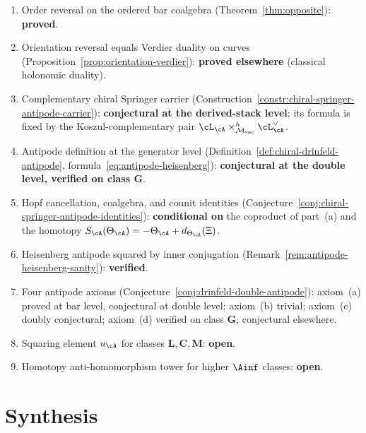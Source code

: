 \begin{remark}
\label{rem:antipode-status}
\begin{enumerate}[label=(\roman*)]
\item Order reversal on the ordered bar coalgebra
(Theorem~\ref{thm:opposite}): \textbf{proved}.
\item Orientation reversal equals Verdier duality on curves
(Proposition~\ref{prop:orientation-verdier}): \textbf{proved
elsewhere} (classical holonomic duality).
\item Complementary chiral Springer carrier
(Construction~\ref{constr:chiral-springer-antipode-carrier}):
\textbf{conjectural at the derived-stack level}; its formula is fixed
by the Koszul-complementary pair
\(\cL_{\cA}\times^h_{\Mvac}\cL_{\cA}^{\vee}\).
\item Antipode definition at the generator level
(Definition~\ref{def:chiral-drinfeld-antipode},
formula~\eqref{eq:antipode-heisenberg}): \textbf{conjectural at
the double level, verified on class $\mathbf{G}$}.
\item Hopf cancellation, coalgebra, and counit identities
(Conjecture~\ref{conj:chiral-springer-antipode-identities}):
\textbf{conditional on} the coproduct of part~(a) and the homotopy
\(S_{\cA}(\Theta_{\cA})=-\Theta_{\cA}+d_{\Theta_{\cA}}(\Xi)\).
\item Heisenberg antipode squared by inner conjugation
(Remark~\ref{rem:antipode-heisenberg-sanity}): \textbf{verified}.
\item Four antipode axioms
(Conjecture~\ref{conj:drinfeld-double-antipode}): axiom~(a)
proved at bar level, conjectural at double level; axiom~(b)
trivial; axiom~(c) doubly conjectural; axiom~(d) verified on
class $\mathbf{G}$, conjectural elsewhere.
\item Squaring element $u_\cA$ for classes
$\mathbf{L}, \mathbf{C}, \mathbf{M}$: \textbf{open}.
\item Homotopy anti-homomorphism tower for higher $\Ainf$ classes:
\textbf{open}.
\end{enumerate}
\end{remark}

\section{Synthesis}
\label{sec:sbf-supplement}

